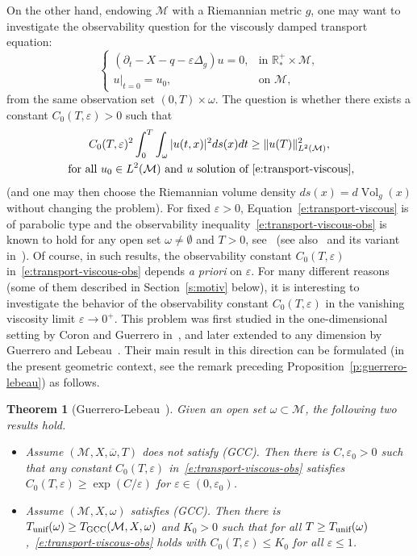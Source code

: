 \documentclass[JEP,XML,SOM,Unicode]{cedram}
\newcommand{\GCC}{\textup{GCC}}
\newcommand{\pGCC}{\textup{(GCC)}\xspace}
\newcommand{\unif}{\textup{unif}}
\newtheorem{theorem}[lemma]{Theorem}
\theoremstyle{definition}
\newcommand{\M}{\ensuremath{\mathcal M}}
\newcommand{\mb}[1]{\ensuremath{\mathbb{#1}}}
\newcommand{\R}{{\mb{R}}}
\DeclareMathOperator{\Vol}{Vol}
\let\d\partial
\let\eps\varepsilon
\let\q q
\begin{document}
On the other hand, endowing $\M$ with a Riemannian metric $g$, one may want to investigate the observability question for the viscously damped transport equation:
\begin{equation}
\label{e:transport-viscous}
\begin{cases}
(\d_t - X -\q - \eps \Delta_g ) u = 0, & \text{in } \R^+_*\times \M, \\
u|_{t=0} = u_0, & \text{on } \M,
\end{cases}
\end{equation}
from the same observation set $(0,T)\times\omega$. The question is whether there exists a constant $C_0(T,\eps)>0$ such that
\begin{multline}
\label{e:transport-viscous-obs}
C_0(T,\eps)^2 \int_0^T\int_\omega |u(t,x)|^2 ds(x)dt \geq \|u (T)\|_{L^2(\M)}^2, \\
\text{ for all } u_0 \in L^2(\M) \text{ and } u \text{ solution of~\eqref{e:transport-viscous}},
\end{multline}
(and one may then choose the Riemannian volume density $ds(x) = d\Vol_g(x)$ without changing the problem).
For fixed $\eps>0$, Equation~\eqref{e:transport-viscous} is of parabolic type and the observability inequality~\eqref{e:transport-viscous-obs} is known to hold for any open set $\omega \neq \emptyset$ and $T>0$, see~\cite{FI:96} (see also~\cite{LR:95} and its variant in~\cite{Lea:10}).
Of course, in such results, the observability constant $C_0(T,\eps)$ in~\eqref{e:transport-viscous-obs} depends {\em a priori} on $\eps$.
For many different reasons (some of them described in Section~\ref{s:motiv} below), it is interesting to investigate the behavior of the observability constant $C_0(T,\eps)$ in the vanishing viscosity limit $\eps \to 0^+$. This problem was first studied in the one-dimensional setting by Coron and Guerrero in~\cite{CG:05}, and later extended to any dimension by Guerrero and Lebeau~\cite{GL:07}. Their main result in this direction can be formulated (in the present geometric context, see the remark preceding Proposition~\ref{p:guerrero-lebeau}) as follows.
\begin{theorem}[Guerrero-Lebeau~\cite{GL:07}]
\label{t:Leb-Guer}
Given an open set $\omega \subset \M$, the following two results hold.
\begin{itemize}
\item \cite[Th.\,1]{GL:07} Assume $(\M,X,\overline{\omega}, T)$ does not satisfy \pGCC. Then there is \hbox{$C, \eps_0>0$} such that any constant $C_0(T,\eps)$ in~\eqref{e:transport-viscous-obs} satisfies $C_0(T,\eps)\geq \exp(C/\eps)$ for $\eps \in (0,\eps_0)$.
\item \cite[Th.\,3]{GL:07} Assume $(\M,X,\omega)$ satisfies \pGCC. Then there is $T_{\unif}(\omega) \geq T_{\GCC}(\M,X,\omega)$ and $K_0>0$ such that for all $T\geq T_{\unif}(\omega)$,~\eqref{e:transport-viscous-obs} holds with $C_0(T,\eps)\leq K_0$ for all $\eps \leq 1$.
\end{itemize}
\end{theorem}
\end{document}
